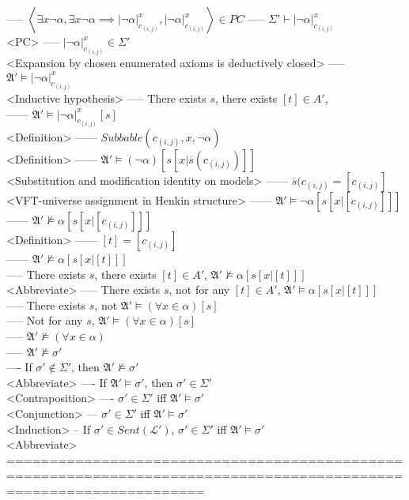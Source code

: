 \documentclass{book}
\newcommand{\inot}{\not}
\newcommand{\extend}[1]{\overline{#1}}
\newcommand{\seq}[1]{\left\langle #1 \right\rangle}
\newcommand{\sub}[3]{\left|#1\right|_{#3}^{#2}}
\begin{document}
					----- $\seq{\exists x \lnot \alpha, \exists x \lnot \alpha \implies \sub{\lnot \alpha}{x}{c_{(i, j)}}, \sub{\lnot \alpha}{x}{c_{(i, j)}}} \in PC$
					----- $\Sigma' \vdash \sub{\lnot \alpha}{x}{c_{(i, j)}}$ \\ <PC>
					----- $\sub{\lnot \alpha}{x}{c_{(i, j)}} \in \Sigma'$ \\ <Expansion by chosen enumerated axioms is deductively closed>
					----- $\mathfrak{A}' \vDash \sub{\lnot \alpha}{x}{c_{(i, j)}}$ \\ <Inductive hypothesis>
					----- There exists $s$, there exists $[t] \in A'$, \\
						------ $\mathfrak{A}' \vDash \sub{\lnot \alpha}{x}{c_{(i, j)}}[s]$ \\ <Definition>
						------ $Subbable(c_{(i, j)}, x, \lnot \alpha)$ \\ <Definition>
						------ $\mathfrak{A}' \vDash (\lnot \alpha)[s[x|\extend{s}(c_{(i, j)})]]$ \\ <Substitution and modification identity on models>
						------ $\extend{s}(c_{(i, j)} = [c_{(i, j)}]$ \\ <VFT-universe assignment in Henkin structure>
						------ $\mathfrak{A}' \vDash \lnot \alpha[s[x|[c_{(i, j)}]]]$ \\
						------ $\mathfrak{A}' \inot \vDash \alpha[s[x|[c_{(i, j)}]]]$ \\ <Definition>
						------ $[t] = [c_{(i, j)}]$ \\
						------ $\mathfrak{A}' \inot \vDash \alpha[s[x|[t]]]$ \\
					----- There exists $s$, there exists $[t] \in A'$, $\mathfrak{A}' \inot \vDash \alpha[s[x|[t]]]$ \\ <Abbreviate>
					----- There exists $s$, not for any $[t] \in A'$, $\mathfrak{A}' \vDash \alpha[s[x|[t]]]$ \\
					----- There exists $s$, not $\mathfrak{A}' \vDash (\forall x \in \alpha)[s]$ \\
					----- Not for any $s$, $\mathfrak{A}' \vDash (\forall x \in \alpha)[s]$ \\
					----- $\mathfrak{A}' \inot \vDash (\forall x \in \alpha)$ \\
					----- $\mathfrak{A}' \inot \vDash \sigma'$ \\
				---- If $\sigma' \inot \in \Sigma'$, then $\mathfrak{A}' \inot \vDash \sigma'$ \\ <Abbreviate>
				---- If $\mathfrak{A}' \vDash \sigma'$, then $\sigma' \in \Sigma'$ \\ <Contraposition>
				---- $\sigma' \in \Sigma'$ iff $\mathfrak{A}' \vDash \sigma'$ \\ <Conjunction>
			--- $\sigma' \in \Sigma'$ iff $\mathfrak{A}' \vDash \sigma'$ \\ <Induction>
		-- If $\sigma' \in Sent(\mathcal{L}')$, $\sigma' \in \Sigma'$ iff $\mathfrak{A}' \vDash \sigma'$ \\ <Abbreviate>
	===================================================================================================================
\end{document}
